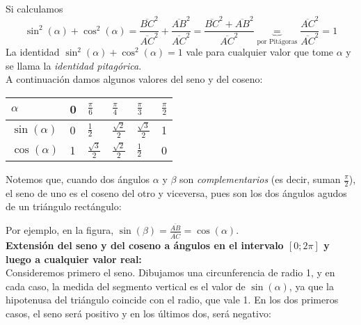 \documentclass[Análisis.root.tex]{subfiles}
\begin{document}
        Si calculamos \[\sin^2(\alpha)+\cos^2(\alpha)=\frac{\overline{BC}^2}{\overline{AC}^2}+\frac{\overline{AB}^2}{\overline{AC}^2}=\frac{\overline{BC}^2+\overline{AB}^2}{\overline{AC}^2}\underbrace{=}_{\text{por Pitágoras}}\frac{\overline{AC}^2}{\overline{AC}^2}=1\]
        La identidad \(\sin^2(\alpha) + \cos^2(\alpha) = 1\) vale para cualquier valor que tome \(\alpha\) y se llama la \textit{identidad pitagórica}.\\
        A continuación damos algunos valores del seno y del coseno:
        \begin{center}
            \begin{tabularx}{\textwidth}{|X|X|X|X|X|X|}
                \hline
                \(\alpha\) & 0 & \(\frac{\pi}{6}\) & \(\frac{\pi}{4}\) & \(\frac{\pi}{3}\) & \(\frac{\pi}{2}\)\\\hline
                \(\sin(\alpha)\) & 0 & \(\frac{1}{2}\) & \(\frac{\sqrt{2}}{2}\) & \(\frac{\sqrt{3}}{2}\) & 1\\\hline
                \(\cos(\alpha)\) & 1 & \(\frac{\sqrt{3}}{2}\) & \(\frac{\sqrt{2}}{2}\) & \(\frac{1}{2}\) & 0\\\hline
            \end{tabularx}
        \end{center}
        Notemos que, cuando dos ángulos \(\alpha\) y \(\beta\) son \textit{complementarios} (es decir, suman \(\frac{\pi}{2}\)), el seno de uno es el coseno del otro y viceversa, pues son los dos ángulos agudos de un triángulo rectángulo:
        \begin{center}
        \end{center}
        Por ejemplo, en la figura, \(\sin(\beta)=\frac{\overline{AB}}{\overline{AC}}=\cos(\alpha)\).\\
        \textbf{Extensión del seno y del coseno a ángulos en el intervalo \([0; 2\pi]\) y luego a cualquier valor real:}\\
        Consideremos primero el seno. Dibujamos una circunferencia de radio 1, y en cada caso, la medida del segmento vertical es el valor de \(\sin(\alpha)\), ya que la hipotenusa del triángulo coincide con el radio, que vale 1. En los dos primeros casos, el seno será positivo y en los últimos dos, será negativo:
\end{document}

